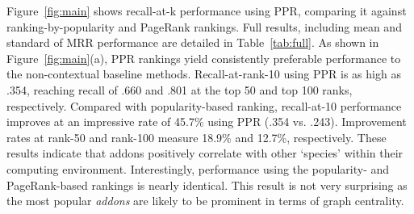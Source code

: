 \documentclass[ijoc,nonblindrev]{informs3} %
\numberwithin{equation}{subsection}
\begin{document}
Figure~\ref{fig:main} shows recall-at-k performance using PPR, comparing it against ranking-by-popularity and PageRank rankings. Full results, including mean and standard of MRR performance are detailed in Table~\ref{tab:full}. As shown in Figure~\ref{fig:main}(a), PPR rankings yield consistently preferable performance to the non-contextual baseline methods. Recall-at-rank-10 using PPR is as high as .354, reaching recall of .660 and .801 at the top 50 and top 100 ranks, respectively. Compared with popularity-based ranking, recall-at-10 performance improves at an impressive rate of 45.7\% using PPR (.354 vs. .243). Improvement rates at rank-50 and rank-100 measure 18.9\% and 12.7\%, respectively. These results indicate that addons positively correlate with other `species' within their computing environment. Interestingly, performance using the popularity- and PageRank-based rankings is nearly identical. This result is not very surprising as the most popular {\it addons} are likely to be prominent in terms of graph centrality. 
\iffalse
\end{document}
